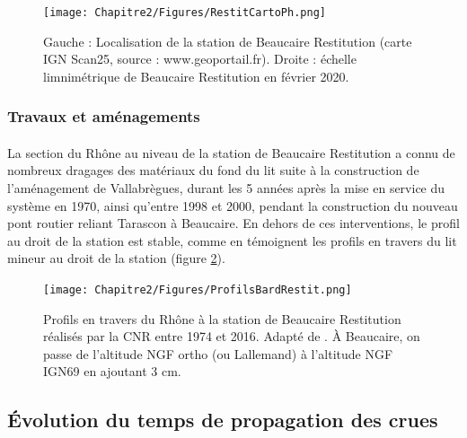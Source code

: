 	\begin{figure}[h]
	\centering
		\texttt{[image: Chapitre2/Figures/RestitCartoPh.png]}
        \caption{Gauche : Localisation de la station de Beaucaire Restitution (carte IGN Scan25, source : www.geoportail.fr). Droite : échelle limnimétrique de Beaucaire Restitution en février 2020.}	
		\label{fig:CartoRes}
	\end{figure}
	
	
		\subsubsection{Travaux et aménagements}

	\paragraph{} La section du Rhône au niveau de la station de Beaucaire Restitution a connu de nombreux dragages des matériaux du fond du lit suite à la construction de l'aménagement de Vallabrègues, durant les 5 années après la mise en service du système en 1970, ainsi qu'entre 1998 et 2000, pendant la construction du nouveau pont routier reliant Tarascon à Beaucaire. En dehors de ces interventions, le profil au droit de la station est stable, comme en témoignent les profils en travers du lit mineur au droit de la station (figure \ref{fig:ProfilsRestit}).
	
	\begin{figure}[h]
	\centering
		\texttt{[image: Chapitre2/Figures/ProfilsBardRestit.png]}
        \caption{Profils en travers du Rhône à la station de Beaucaire Restitution réalisés par la CNR entre 1974 et 2016. Adapté de \citet{bard_actualisation_2018}. À Beaucaire, on passe de l'altitude NGF ortho (ou Lallemand) à l'altitude NGF IGN69 en ajoutant 3 cm.}	
		\label{fig:ProfilsRestit}
	\end{figure}
	
\FloatBarrier


\subsection{Évolution du temps de propagation des crues}

